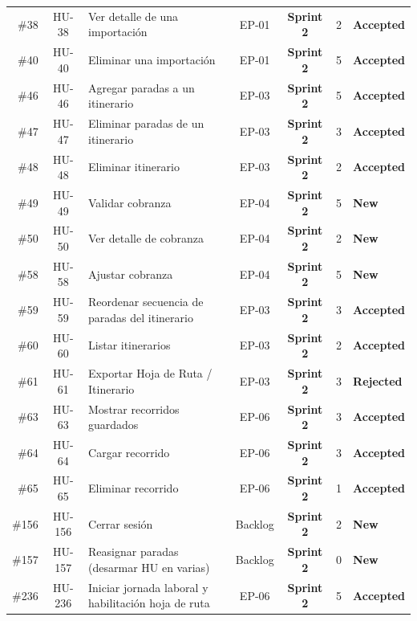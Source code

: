 \documentclass[a4paper,9pt]{article}
\begin{document}
\begin{longtable}{r c p{8.2cm} c c c l}
\#38 & HU-38 & Ver detalle de una importación & EP-01 & \textbf{Sprint 2} & 2 & \textcolor{tealstatus}{\textbf{Accepted}} \\
\#40 & HU-40 & Eliminar una importación & EP-01 & \textbf{Sprint 2} & 5 & \textcolor{tealstatus}{\textbf{Accepted}} \\
\#46 & HU-46 & Agregar paradas a un itinerario & EP-03 & \textbf{Sprint 2} & 5 & \textcolor{tealstatus}{\textbf{Accepted}} \\
\#47 & HU-47 & Eliminar paradas de un itinerario & EP-03 & \textbf{Sprint 2} & 3 & \textcolor{tealstatus}{\textbf{Accepted}} \\
\#48 & HU-48 & Eliminar itinerario & EP-03 & \textbf{Sprint 2} & 2 & \textcolor{tealstatus}{\textbf{Accepted}} \\
\#49 & HU-49 & Validar cobranza & EP-04 & \textbf{Sprint 2} & 5 & \textcolor{bluestatus}{\textbf{New}} \\
\#50 & HU-50 & Ver detalle de cobranza & EP-04 & \textbf{Sprint 2} & 2 & \textcolor{bluestatus}{\textbf{New}} \\
\#58 & HU-58 & Ajustar cobranza & EP-04 & \textbf{Sprint 2} & 5 & \textcolor{bluestatus}{\textbf{New}} \\
\#59 & HU-59 & Reordenar secuencia de paradas del itinerario & EP-03 & \textbf{Sprint 2} & 3 & \textcolor{tealstatus}{\textbf{Accepted}} \\
\#60 & HU-60 & Listar itinerarios & EP-03 & \textbf{Sprint 2} & 2 & \textcolor{tealstatus}{\textbf{Accepted}} \\
\#61 & HU-61 & Exportar Hoja de Ruta / Itinerario & EP-03 & \textbf{Sprint 2} & 3 & \textcolor{redstatus}{\textbf{Rejected}} \\
\#63 & HU-63 & Mostrar recorridos guardados & EP-06 & \textbf{Sprint 2} & 3 & \textcolor{tealstatus}{\textbf{Accepted}} \\
\#64 & HU-64 & Cargar recorrido & EP-06 & \textbf{Sprint 2} & 3 & \textcolor{tealstatus}{\textbf{Accepted}} \\
\#65 & HU-65 & Eliminar recorrido & EP-06 & \textbf{Sprint 2} & 1 & \textcolor{tealstatus}{\textbf{Accepted}} \\
\#156 & HU-156 & Cerrar sesión & Backlog & \textbf{Sprint 2} & 2 & \textcolor{bluestatus}{\textbf{New}} \\
\#157 & HU-157 & Reasignar paradas (desarmar HU en varias) & Backlog & \textbf{Sprint 2} & 0 & \textcolor{bluestatus}{\textbf{New}} \\
\#236 & HU-236 & Iniciar jornada laboral y habilitación hoja de ruta & EP-06 & \textbf{Sprint 2} & 5 & \textcolor{tealstatus}{\textbf{Accepted}} \\

\end{longtable}
\end{document}

